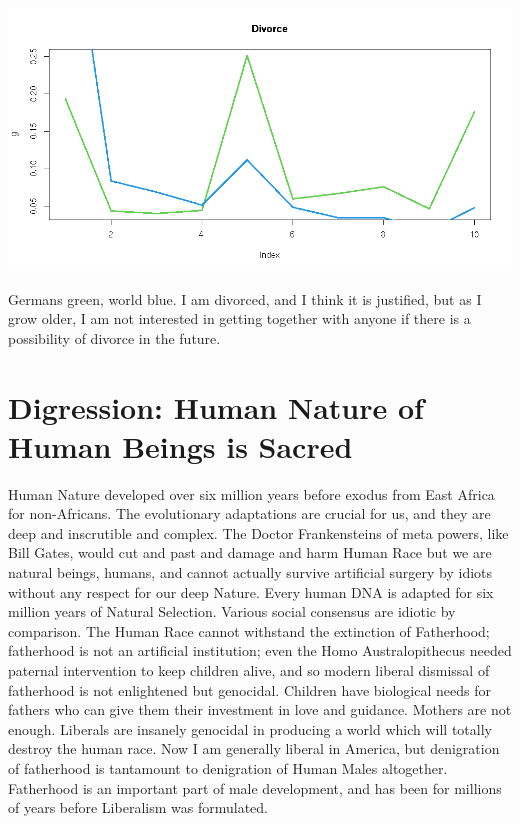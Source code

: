 \documentclass{amsart}
\begin{document}
\includegraphics[scale=0.5]{divorce.jpeg}

Germans green, world blue.
I am divorced, and I think it is justified, but as I grow older, I am not interested in getting together with anyone if there is a possibility of divorce in the future.

\section{Digression: Human Nature of Human Beings is Sacred}

Human Nature developed over six million years before exodus from East Africa for non-Africans.  The evolutionary adaptations are crucial for us, and they are deep and inscrutible and complex.  The Doctor Frankensteins of meta powers, like Bill Gates, would cut and past and damage and harm Human Race but we are natural beings, humans, and cannot actually survive artificial surgery by idiots without any respect for our deep Nature.  Every human DNA is adapted for six million years of Natural Selection.  Various social consensus are idiotic by comparison.  The Human Race cannot withstand the extinction of Fatherhood; fatherhood is not an artificial institution; even the Homo Australopithecus needed paternal intervention to keep children alive, and so modern liberal dismissal of fatherhood is not enlightened but genocidal.  Children have biological needs for fathers who can give them their investment in love and guidance.  Mothers are not enough.  Liberals are insanely genocidal in producing a world which will totally destroy the human race.  Now I am generally liberal in America, but denigration of fatherhood is tantamount to denigration of Human Males altogether.  Fatherhood is an important part of male development, and has been for millions of years before Liberalism was formulated.
\end{document}
